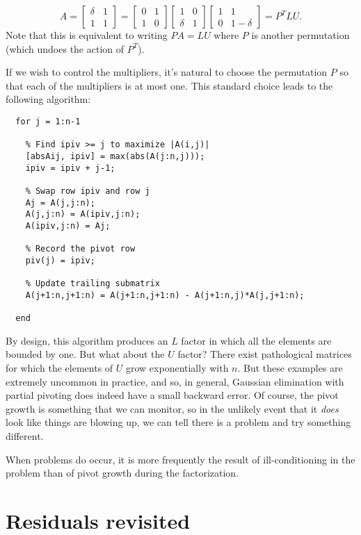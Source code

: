 \documentclass[12pt, leqno]{article}
\begin{document}
\[
  A = \begin{bmatrix} \delta & 1 \\ 1 & 1 \end{bmatrix} =
      \begin{bmatrix} 0 & 1 \\ 1 & 0 \end{bmatrix}
      \begin{bmatrix} 1 & 0 \\ \delta & 1 \end{bmatrix}
      \begin{bmatrix} 1 & 1 \\ 0 & 1-\delta \end{bmatrix}
    = P^T LU.
\]
Note that this is equivalent to writing $P A = LU$ where $P$
is another permutation (which undoes the action of $P^T$).

If we wish to control the multipliers, it's natural to choose
the permutation $P$ so that each of the multipliers is at most one.
This standard choice leads to the following algorithm:
\begin{lstlisting}
  for j = 1:n-1

    % Find ipiv >= j to maximize |A(i,j)|
    [absAij, ipiv] = max(abs(A(j:n,j)));
    ipiv = ipiv + j-1;

    % Swap row ipiv and row j
    Aj = A(j,j:n);
    A(j,j:n) = A(ipiv,j:n);
    A(ipiv,j:n) = Aj;

    % Record the pivot row
    piv(j) = ipiv;

    % Update trailing submatrix
    A(j+1:n,j+1:n) = A(j+1:n,j+1:n) - A(j+1:n,j)*A(j,j+1:n);

  end
\end{lstlisting}

By design, this algorithm produces an $L$ factor in which all the
elements are bounded by one.  But what about the $U$ factor?  There
exist pathological matrices for which the elements of $U$ grow
exponentially with $n$.  But these examples are extremely uncommon in
practice, and so, in general, Gaussian elimination with partial
pivoting does indeed have a small backward error.  Of course, the
pivot growth is something that we can monitor, so in the unlikely event
that it {\em does} look like things are blowing up, we can tell there
is a problem and try something different.

When problems do occur, it is more frequently the result of
ill-conditioning in the problem than of pivot growth during the
factorization.

\section{Residuals revisited}
\end{document}
